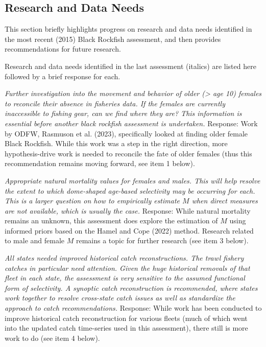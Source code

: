 \documentclass[11pt,
  english,
  letterpaper,
]{article}
\begin{document}
\hypertarget{research-and-data-needs-1}{%
\subsection{Research and Data Needs}\label{research-and-data-needs-1}}

This section briefly highlights progress on research and data needs identified in the most recent (2015) Black Rockfish assessment, and then provides recommendations for future research.

Research and data needs identified in the last assessment (italics) are listed here followed by a brief response for each.

\textit{Further investigation into the movement and behavior of older (> age 10) females to reconcile their absence in fisheries data. If the females are currently inaccessible to fishing gear, can we find where they are? This information is essential before another black rockfish assessment is undertaken.} Response: Work by ODFW, Rasmuson et al. (2023), specifically looked at finding older female Black Rockfish. While this work was a step in the right direction, more hypothesis-drive work is needed to reconcile the fate of older females (thus this recommendation remains moving forward, see item 1 below).

\textit{Appropriate natural mortality values for females and males. This will help resolve the extent to which dome-shaped age-based selectivity may be occurring for each. This is a larger question on how to empirically estimate $M$ when direct measures are not available, which is usually the case.} Response: While natural mortality remains an unknown, this assessment does explore the estimation of \(M\) using informed priors based on the Hamel and Cope (2022) method. Research related to male and female \(M\) remains a topic for further research (see item 3 below).

\textit{All states needed improved historical catch reconstructions. The trawl fishery catches in particular need attention. Given the huge historical removals of that fleet in each state, the assessment is very sensitive to the assumed functional form of selectivity. A synoptic catch reconstruction is recommended, where states work together to resolve cross-state catch issues as well as standardize the approach to catch recommendations.} Response: While work has been conducted to improve historical catch reconstruction for various fleets (much of which went into the updated catch time-series used in this assessment), there still is more work to do (see item 4 below).
\end{document}
